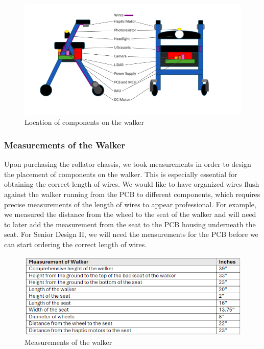 \begin{figure}[H]
	\centering
	\includegraphics[width=1\textwidth]{./Images/component_location_camera.png}
	\caption{\label{fig:Component-Locations}Location of components on the walker}
\end{figure}

\subsubsection{Measurements of the Walker}
\noindent Upon purchasing the rollator chassis, we took measurements in order to design the placement of components on the walker. This is especially essential for obtaining the correct length of wires. We would like to have organized wires flush against the walker running from the PCB to different components, which requires precise measurements of the length of wires to appear professional. For example, we measured the distance from the wheel to the seat of the walker and will need to later add the measurement from the seat to the PCB housing underneath the seat. For Senior Design II, we will need the measurements for the PCB before we can start ordering the correct length of wires.\\

\begin{figure}[H]
	\centering
	\includegraphics[width=1\textwidth]{./Images/measurements.png}
	\caption{\label{fig:Measurements_of_walker}Measurements of the walker}
\end{figure}


